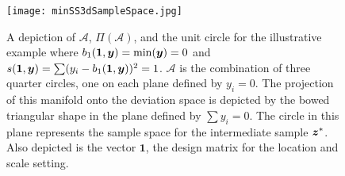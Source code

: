 \documentclass[ba]{imsart}
\newcommand{\by}{\mbox{\boldmath $y$}}
\newcommand{\bz}{\mbox{\boldmath $z$}}
\begin{document}
\begin{figure}[t]
\centering
\texttt{[image: minSS3dSampleSpace.jpg]}
\caption{A depiction of $\mathcal{A}$, $\Pi(\mathcal{A})$, and the
  unit circle for the illustrative example where $b_{1}(\mathbf{1},\by)=\min(\by)=0$ and
  $s(\mathbf{1},\by)=\sum (y_i -b_{1}(\mathbf{1},\by))^2 =1$.
$\mathcal{A}$ is the combination of three quarter circles, one
  on each plane defined by $y_i=0$. The projection of this manifold
  onto the deviation space is depicted by the bowed triangular shape
  in the plane defined by $\sum y_i=0$. The circle in this plane
  represents the sample space for the intermediate sample $\bz^*$. Also
  depicted is the vector $\mathbf{1}$, the design matrix for the
  location and scale setting.}
\label{fig:sampSpace}
\end{figure}

%
\end{document}
